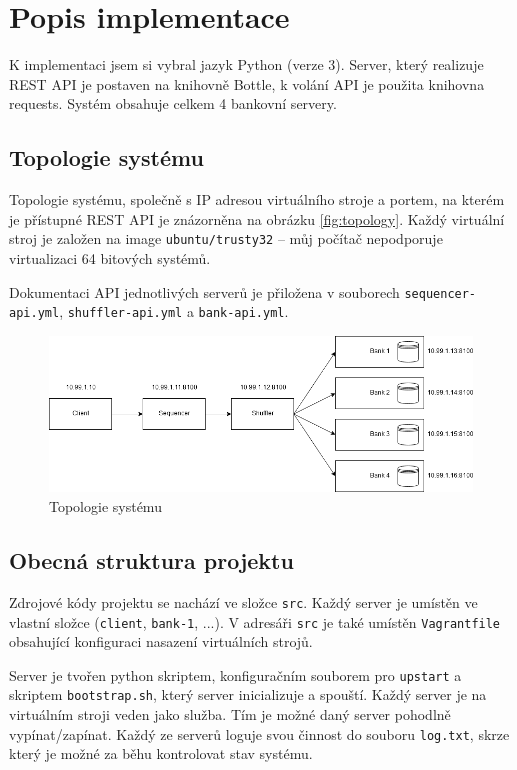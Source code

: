 \documentclass[11pt,a4paper]{scrartcl}
\begin{document}
	\section{Popis implementace}
	K implementaci jsem si vybral jazyk Python (verze 3). Server, který realizuje REST API je postaven na knihovně Bottle, k volání API je použita knihovna requests. Systém obsahuje celkem 4 bankovní servery.
	
	\subsection{Topologie systému}
	Topologie systému, společně s IP adresou virtuálního stroje a portem, na kterém je přístupné REST API je znázorněna na obrázku \ref{fig:topology}. Každý virtuální stroj je založen na image \verb|ubuntu/trusty32| -- můj počítač nepodporuje virtualizaci 64 bitových systémů.
	
	Dokumentaci API jednotlivých serverů je přiložena v souborech \verb|sequencer-api.yml|, \verb|shuffler-api.yml| a \verb|bank-api.yml|.
	
	\begin{figure}[H]
		\centering
		\includegraphics[width=15cm]{topology.png}
		\caption{Topologie systému}
		\label{fig:topology.pdf_tex}
	\end{figure}
	
	\subsection{Obecná struktura projektu}
	Zdrojové kódy projektu se nachází ve složce \verb|src|. Každý server je umístěn ve vlastní složce (\verb|client|, \verb|bank-1|, ...). V adresáři \verb|src| je také umístěn \verb|Vagrantfile| obsahující konfiguraci nasazení virtuálních strojů. 
	
	Server je tvořen python skriptem, konfiguračním souborem pro \verb|upstart| a skriptem \verb|bootstrap.sh|, který server inicializuje a spouští. Každý server je na virtuálním stroji veden jako služba. Tím je možné daný server pohodlně vypínat/zapínat. 	Každý ze serverů loguje svou činnost do souboru \verb|log.txt|, skrze který je možné za běhu kontrolovat stav systému. 
	
\end{document}

